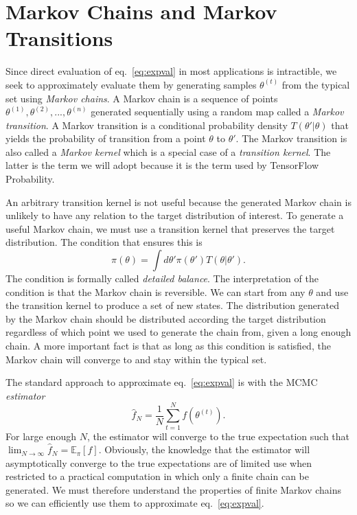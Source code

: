 \section{Markov Chains and Markov Transitions}
Since direct evaluation of eq.~\eqref{eq:expval} in most applications is intractible, we seek to approximately evaluate them
by generating samples $\theta^{(t)}$ from the typical set using \textit{Markov chains}. A Markov chain is a sequence of points $\theta^{(1)}, \theta^{(2)}, ..., \theta^{(n)}$ generated sequentially
using a random map called a \textit{Markov transition}. A Markov transition is a conditional probability density
$T(\theta'|\theta)$ that yields the probability of transition from a point $\theta$ to $\theta'$. The Markov transition is also called
a \textit{Markov kernel} which is a special case of a \textit{transition kernel}. The latter is the term we will adopt because it
is the term used by TensorFlow Probability.

An arbitrary transition kernel is not useful because the generated Markov chain is unlikely to have any relation to the target distribution
of interest. To generate a useful Markov chain, we must use a transition kernel that preserves the target distribution. 
The condition that ensures this is
\begin{equation}\label{eq:detailed_balance}
    \pi(\theta) = \int d\theta' \pi(\theta')T(\theta|\theta').
\end{equation}
The condition is formally called \textit{detailed balance}. The interpretation of the condition is that the Markov chain is reversible.
We can start from any $\theta$ and use the transition kernel to produce a set of new states. The distribution generated by the Markov chain
should be distributed according the target distribution regardless of which point we used to generate the chain from, given a long enough chain. A more important
fact is that as long as this condition is satisfied, the Markov chain will converge to and stay within the typical set.

The standard approach to approximate eq.~\eqref{eq:expval} is with the MCMC \textit{estimator}
\begin{equation}
    \hat{f}_N = \frac{1}{N}\sum_{t=1}^N f(\theta^{(t)}).
\end{equation}
For large enough $N$, the estimator will converge to the true expectation such that $\lim_{N\to\infty} \hat{f}_N = \mathbb{E}_\pi[f]$.
Obviously, the knowledge that the estimator will asymptotically converge to the true expectations are of limited use
when restricted to a practical computation in which only a finite chain can be generated. 
We must therefore understand the properties of finite Markov chains so we can efficiently use them to approximate eq.~\eqref{eq:expval}.

